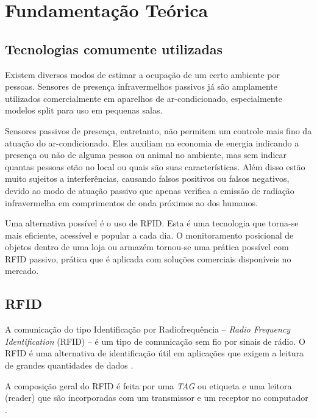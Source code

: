
\chapter{Fundamentação Teórica\label{chap:Fundamentacao}}


\section{Tecnologias comumente utilizadas}
 
 Existem diversos modos de estimar a ocupação de um certo ambiente por pessoas. Sensores de presença infravermelhos passivos já são amplamente utilizados comercialmente em aparelhos de ar-condicionado, especialmente modelos split para uso em pequenas salas.
 
 Sensores passivos de presença, entretanto, não permitem um controle mais fino da atuação do ar-condicionado. Eles auxiliam na economia de energia indicando a presença ou não de alguma pessoa ou animal no ambiente, mas sem indicar quantas pessoas etão no local ou quais são suas características. Além disso estão muito sujeitos a interferências, causando falsos positivos ou falsos negativos, devido ao modo de atuação passivo que apenas verifica a emissão de radiação infravermelha em comprimentos de onda próximos ao dos humanos.

 Uma alternativa possível é o uso de RFID. Esta é uma tecnologia que torna-se mais eficiente, acessível e popular a cada dia. O monitoramento posicional de objetos dentro de uma loja ou armazém tornou-se uma prática possível com RFID passivo, prática que é aplicada com soluções comerciais disponíveis no mercado.
 
\section{RFID} \label{section: RFID}

A comunicação do tipo Identificação por Radiofrequência – \textit{Radio Frequency Identification} (RFID) – é um tipo de comunicação sem fio por sinais de rádio. O RFID é uma alternativa de identificação útil em aplicações que exigem a leitura de grandes quantidades de dados \cite{rao1999overview}. 

A composição geral do RFID é feita por uma \textit{TAG} ou etiqueta e uma leitora (reader) que são incorporadas com um transmissor e um receptor no computador \cite{EPC-RFID-link}.

